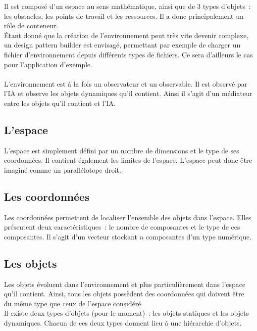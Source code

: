 Il est composé d'un espace au sens mathématique, ainsi que de 3 types d'objets~: les obstacles, les points de travail et les ressources. Il a donc principalement un rôle de conteneur.\\

\'Etant donné que la création de l'environnement peut très vite devenir complexe, un design pattern builder est envisagé, permettant par exemple de charger un fichier d'environnement depuis différents types de fichiers.
Ce sera d'ailleurs le cas pour l'application d'exemple.\\\\

L'environnement est à la fois un observateur et un observable. Il est observé par l'IA et observe les objets dynamiques qu'il contient. Ainsi il s'agit d'un médiateur entre les objets qu'il contient et l'IA.

\subsection{L'espace}

L'espace est simplement défini par un nombre de dimensions et le type de ses coordonnées.
Il contient également les limites de l'espace. L'espace peut donc être imaginé comme un parallélotope droit.

\subsection{Les coordonnées}

Les coordonnées permettent de localiser l'ensemble des objets dans l'espace. Elles présentent deux caractéristiques~: le nombre de composantes et le type de ces composantes. Il s'agit d'un vecteur stockant $n$ composantes d'un type numérique.

\subsection{Les objets}

Les objets évoluent dans l'environnement et plus particulièrement dans l'espace qu'il contient. Ainsi, tous les objets possèdent des coordonnées qui doivent être du même type que ceux de l'espace considéré.\\
\indent Il existe deux types d'objets (pour le moment)~: les objets statiques et les objets dynamiques. Chacun de ces deux types donnent lieu à une hiérarchie d'objets.\\

